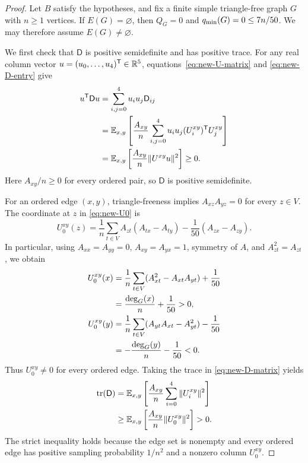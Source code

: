 \begin{proof}
Let $B$ satisfy the hypotheses, and fix a finite simple triangle-free
graph $G$ with $n\geq1$ vertices.
If $E(G)=\varnothing$, then $Q_G=0$ and
$q_{\min}(G)=0\leq7n/50$.
We may therefore assume $E(G)\ne\varnothing$.

We first check that $\mathsf D$ is positive semidefinite and has positive
trace.
For any real column vector $u=(u_0,\ldots,u_4)^{\mathsf T}\in\mathbb R^5$,
equations~\eqref{eq:new-U-matrix} and \eqref{eq:new-D-entry} give
\begin{align}
u^{\mathsf T}\mathsf D u
&=\sum_{i,j=0}^4u_i u_j\mathsf D_{ij}\notag\\
&=\mathbb E_{x,y}\left[\frac{A_{xy}}n
  \sum_{i,j=0}^4u_i u_j(U_i^{xy})^{\mathsf T}U_j^{xy}\right]\notag\\
&=\mathbb E_{x,y}\left[\frac{A_{xy}}n\|U^{xy}u\|^2\right]\geq0.
\label{eq:new-D-psd}
\end{align}
Here $A_{xy}/n\geq0$ for every ordered pair, so $\mathsf D$ is positive
semidefinite.

For an ordered edge $(x,y)$, triangle-freeness implies
$A_{xz}A_{yz}=0$ for every $z\in V$.
The coordinate at $z$ in \eqref{eq:new-U0} is
\begin{equation}\label{eq:new-U0-coordinate}
U_0^{xy}(z)
=\frac1n\sum_{t\in V}A_{zt}(A_{tx}-A_{ty})
 -\frac1{50}(A_{zx}-A_{zy}).
\end{equation}
In particular, using $A_{xx}=A_{yy}=0$, $A_{xy}=A_{yx}=1$, symmetry of
$A$, and $A_{zt}^2=A_{zt}$, we obtain
\begin{align}
U_0^{xy}(x)
&=\frac1n\sum_{t\in V}
  (A_{xt}^2-A_{xt}A_{yt})+\frac1{50}\notag\\
&=\frac{\deg_G(x)}n+\frac1{50}>0,
\label{eq:new-U0-at-x}\\
U_0^{xy}(y)
&=\frac1n\sum_{t\in V}
  (A_{yt}A_{xt}-A_{yt}^2)-\frac1{50}\notag\\
&=-\frac{\deg_G(y)}n-\frac1{50}<0.
\label{eq:new-U0-at-y}
\end{align}
Thus $U_0^{xy}\ne0$ for every ordered edge.
Taking the trace in \eqref{eq:new-D-matrix} yields
\begin{align}
\operatorname{tr}(\mathsf D)
&=\mathbb E_{x,y}\left[\frac{A_{xy}}n
  \sum_{i=0}^4\|U_i^{xy}\|^2\right]\notag\\
&\geq\mathbb E_{x,y}\left[\frac{A_{xy}}n\|U_0^{xy}\|^2\right]>0.
\label{eq:new-D-positive-trace}
\end{align}
The strict inequality holds because the edge set is nonempty and every
ordered edge has positive sampling probability $1/n^2$ and a nonzero
column $U_0^{xy}$.


\end{proof}
